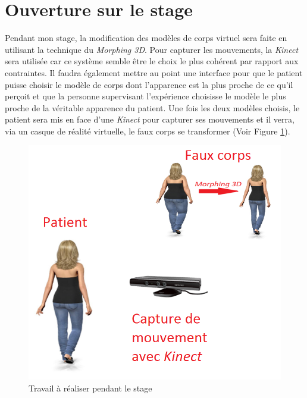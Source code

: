\documentclass[11pt]{article}
\begin{document}
\section{Ouverture sur le stage}
Pendant mon stage, la modification des modèles de corps virtuel sera faite en utilisant la technique du \emph{Morphing 3D}. Pour capturer les mouvements, la \emph{Kinect} sera utilisée car ce système semble être le choix le plus cohérent par rapport aux contraintes. Il faudra également mettre au point une interface pour que le patient puisse choisir le modèle de corps dont l'apparence est la plus proche de ce qu'il perçoit et que la personne supervisant l'expérience choisisse le modèle le plus proche de la véritable apparence du patient. Une fois les deux modèles choisis, le patient sera mis en face d'une \emph{Kinect} pour capturer ses mouvements et il verra, via un casque de réalité virtuelle, le faux corps se transformer (Voir Figure \ref{fig10}).
\begin{figure}[!h]
   	\centerline{\includegraphics[scale=0.6]{./schema}}
   	\caption{\label{fig10} Travail à réaliser pendant le stage}
\end{figure}

%
%
\end{document}
